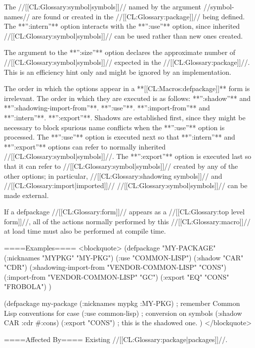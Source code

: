 
The //[[CL:Glossary:symbol|symbols]]// named by the argument //symbol-names// are found or created in the //[[CL:Glossary:package]]// being defined. The **'':intern''** option interacts with the **'':use''** option, since inherited //[[CL:Glossary:symbol|symbols]]// can be used rather than new ones created.


The argument to the **'':size''** option declares the approximate number of //[[CL:Glossary:symbol|symbols]]// expected in the //[[CL:Glossary:package]]//. This is an efficiency hint only and might be ignored by an implementation. \endlist

The order in which the options appear in a **[[CL:Macros:defpackage]]** form is irrelevant. The order in which they are executed is as follows: \beginlist {} **'':shadow''** and **'':shadowing-import-from''**.  **'':use''**.  **'':import-from''** and **'':intern''**.  **'':export''**. \endlist Shadows are established first, since they might be necessary to block spurious name conflicts when the **'':use''** option is processed. The **'':use''** option is executed next so that **'':intern''** and **'':export''** options can refer to normally inherited //[[CL:Glossary:symbol|symbols]]//. The **'':export''** option is executed last so that it can refer to //[[CL:Glossary:symbol|symbols]]// created by any of the other options; in particular, //[[CL:Glossary:shadowing symbols]]// and //[[CL:Glossary:import|imported]]// //[[CL:Glossary:symbol|symbols]]// can be made external.


If a {defpackage} //[[CL:Glossary:form]]// appears as a //[[CL:Glossary:top level form]]//, all of the actions normally performed by this //[[CL:Glossary:macro]]// at load time must also be performed at compile time.


====Examples====
<blockquote> (defpackage "MY-PACKAGE" (:nicknames "MYPKG" "MY-PKG") (:use "COMMON-LISP") (:shadow "CAR" "CDR") (:shadowing-import-from "VENDOR-COMMON-LISP" "CONS") (:import-from "VENDOR-COMMON-LISP" "GC") (:export "EQ" "CONS" "FROBOLA") )


(defpackage my-package (:nicknames mypkg :MY-PKG) ; remember Common Lisp conventions for case (:use common-lisp) ; conversion on symbols (:shadow CAR :cdr #:cons) (:export "CONS") ; this is the shadowed one. ) </blockquote>

====Affected By====
Existing //[[CL:Glossary:package|packages]]//.

